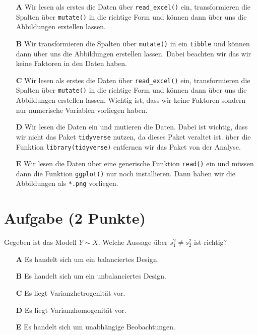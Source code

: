 \documentclass[a4paper, 9pt]{scrartcl}\usepackage[]{graphicx}\usepackage[]{xcolor}
\begin{document}
\begin{enumerate}
\item [\textbf{A} \msquare] Wir lesen als erstes die Daten über \texttt{read\_excel()} ein, transformieren die Spalten über \texttt{mutate()} in die richtige Form und können dann über  uns die Abbildungen erstellen lassen.
\item [\textbf{B} \msquare] Wir transformieren die Spalten über \texttt{mutate()} in ein \texttt{tibble} und können dann über  uns die Abbildungen erstellen lassen. Dabei beachten wir das wir keine Faktoren in den Daten haben.
\item [\textbf{C} \msquare] Wir lesen als erstes die Daten über \texttt{read\_excel()} ein, transformieren die Spalten über \texttt{mutate()} in die richtige Form und können dann  über  uns die Abbildungen erstellen lassen. Wichtig ist, dass wir keine Faktoren sondern nur numerische Variablen vorliegen haben.
\item [\textbf{D} \msquare] Wir lesen die Daten ein und mutieren die Daten. Dabei ist wichtig, dass wir nicht das Paket \texttt{tidyverse} nutzen, da dieses Paket veraltet ist. über die Funktion \texttt{library(tidyverse)} entfernen wir das Paket von der Analyse.
\item [\textbf{E} \msquare] Wir lesen die Daten über eine generische Funktion \texttt{read()} ein und müssen dann die Funktion \texttt{ggplot()} nur noch installieren. Dann haben wir die Abbildungen als \texttt{*.png} vorliegen.
\end{enumerate}

\section{Aufgabe \hfill (2 Punkte)}



Gegeben ist das Modell $Y \sim X$. Welche Aussage über $s^2_1 \neq s^2_2$ ist richtig?



\begin{enumerate}
\item [\textbf{A} \msquare] Es handelt sich um ein balanciertes Design.
\item [\textbf{B} \msquare] Es handelt sich um ein unbalanciertes Design.
\item [\textbf{C} \msquare] Es liegt Varianzhetrogenität vor.
\item [\textbf{D} \msquare] Es liegt Varianzhomogenität vor.
\item [\textbf{E} \msquare] Es handelt sich um unabhängige Beobachtungen.
\end{enumerate}
\end{document}

